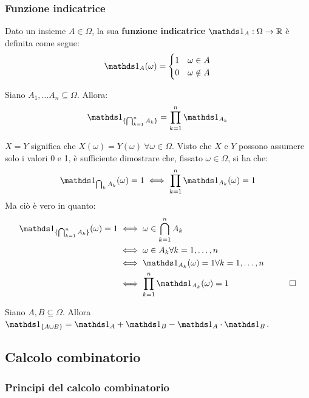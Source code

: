 \subsubsection{Funzione indicatrice}

\begin{defn}
	Dato un insieme $A \in \Omega$, la sua \textbf{funzione indicatrice} $ \Ind_{A} : \Omega \to \RR$ è definita come segue: 
	$$ \Ind_{A}(\omega) =
	 \begin{cases}
	1 & \omega \in A \\
	0 & \omega \notin A
	\end{cases} $$
	
\end{defn}

\begin{prop}
	Siano $A_1, \dots A_n \subseteq \Omega$. Allora:
	$$\Ind_{ \{\bigcap_{k=1}^{n}A_k\}} = \prod_{k=1}^{n}\Ind_{ A_k }$$
\end{prop}

\begin{dimo}
	$X=Y$ significa che $X(\omega) = Y(\omega) \ \forall \omega \in \Omega$.
	Visto che $X$ e $Y$ possono assumere solo i valori 0 e 1, è sufficiente dimostrare che, fissato $\omega \in \Omega$,
	si ha che:
	$$ \Ind_{ \bigcap_{k}{A_k} }(\omega) = 1 \iff \prod_{k=1}^{n}\Ind_{A_k}(\omega) = 1$$
	Ma ciò è vero in quanto:
	\begin{align*}
		\Ind_{ \{\bigcap_{k=1}^n{A_k} \} }(\omega) = 1 
		& \iff \omega \in \bigcap_{k=1}^n{A_k} \\
		& \iff \omega \in A_k \forall k = 1,\dots,n \\
		& \iff \Ind_{A_k}(\omega) = 1 \forall k=1,\dots,n \\
		& \iff  \prod_{k=1}^{n}\Ind_{ A_k }(\omega) = 1 & \qedhere
	\end{align*}
\end{dimo}

\begin{prop}
	Siano $A,B \subseteq \Omega$. Allora $\Ind_{ \{A \cup B\} } = \Ind_A + \Ind_B - \Ind_A \cdot \Ind_B$.
\end{prop}

\subsection{Calcolo combinatorio}

\subsubsection{Principi del calcolo combinatorio}

